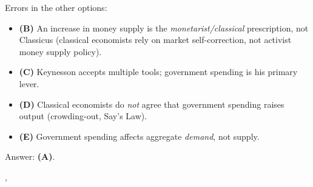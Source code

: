 {{    Errors in the other options:
    \begin{itemize}
      \item \textbf{(B)} An increase in money supply is the
            \emph{monetarist/classical} prescription, not Classicus
            (classical economists rely on market self-correction, not
            activist money supply policy).
      \item \textbf{(C)} Keynesson accepts multiple tools; government
            spending is his primary lever.
      \item \textbf{(D)} Classical economists do \emph{not} agree that
            government spending raises output (crowding-out, Say's Law).
      \item \textbf{(E)} Government spending affects aggregate
            \emph{demand}, not supply.
    \end{itemize}

    Answer: \textbf{(A)}.
  },
}
